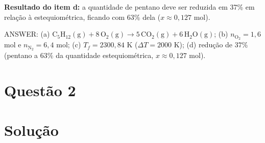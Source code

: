 \documentclass{article}%
\begin{document}
\textbf{Resultado do item d:} a quantidade de pentano deve ser reduzida em 37\% em relação à estequiométrica, ficando com 63\% dela ($x\approx0{,}127$ mol).

ANSWER: (a) $\mathrm{C_5H_{12}(g)}+8\,\mathrm{O_2(g)}\rightarrow 5\,\mathrm{CO_2(g)}+6\,\mathrm{H_2O(g)}$; (b) $n_{\mathrm{O_2}}=1{,}6$ mol e $n_{\mathrm{N_2}}=6{,}4$ mol; (c) $T_f=2300{,}84$ K ($\Delta T=2000$ K); (d) redução de $37\%$ (pentano a $63\%$ da quantidade estequiométrica, $x\approx0{,}127$ mol).%
\newpage%
\section*{Questão 2}

\section*{Solução}
\end{document}
